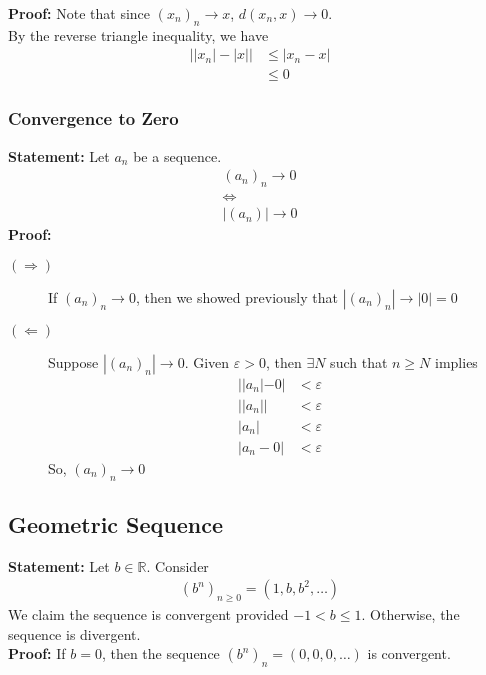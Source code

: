 \documentclass[10pt]{extarticle}
\newcommand{\R}{\mathbb{R}}
\begin{document}
  \textbf{Proof:} Note that since $(x_n)_n \rightarrow x$, $d(x_n,x) \rightarrow 0$.\\

      By the reverse triangle inequality, we have
      \begin{align*}
        \left||x_n| - |x|\right| &\leq |x_n - x|\\
        &\leq 0
      \end{align*}
  \subsubsection{Convergence to Zero}%
  \textbf{Statement:} Let $a_n$ be a sequence.
    \begin{align*}
      (a_n)_n \rightarrow 0\\
      \Leftrightarrow\\
      |(a_n)| \rightarrow 0
    \end{align*}
    \textbf{Proof:}
    \begin{description}
      \item[$(\Rightarrow)$] If $(a_n)_n \rightarrow 0$, then we showed previously that $|(a_n)_n| \rightarrow |0| = 0$
      \item[$(\Leftarrow)$] Suppose $|(a_n)_n| \rightarrow 0$. Given $\varepsilon > 0$, then $\exists N$ such that $n \geq N$ implies
        \begin{align*}
          ||a_n|-0| &< \varepsilon\\
          ||a_n|| &< \varepsilon\\
          |a_n| &< \varepsilon\\
          |a_n - 0| &< \varepsilon
        \end{align*}
        So, $\left(a_n\right)_n \rightarrow 0$
    \end{description}
  \subsection{Geometric Sequence}%
  \textbf{Statement:} Let $b\in\R$. Consider
    \begin{align*}
      \left(b^n\right)_{n\geq 0} = (1,b,b^2,\dots)
    \end{align*}
    We claim the sequence is convergent provided $-1 < b \leq 1$. Otherwise, the sequence is divergent.\\

    \textbf{Proof:} If $b = 0$, then the sequence $(b^n)_{n} = (0,0,0,\dots)$ is convergent.\\
\end{document}
